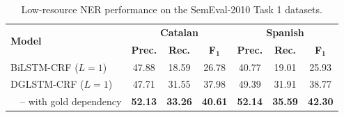\begin{table}[h!]
	\centering
	\begin{tabular}{lcccccc}
		\toprule
		\multirow{2}{*}{\textbf{Model}}&  \multicolumn{3}{c}{\textbf{Catalan}}& \multicolumn{3}{c}{\textbf{Spanish}}\\[-1mm]
		\cmidrule(lr){2-4} \cmidrule(lr){5-7} 
		& \textbf{Prec.} & \textbf{Rec.} & \textbf{F}$_\mathbf{1}$& \textbf{Prec.} & \textbf{Rec.} & \textbf{F}$_\mathbf{1}$ \\
		\midrule
		BiLSTM-CRF ($L=1$) & 47.88 & 18.59 & 26.78 & 40.77 & 19.01 & 25.93 \\
		DGLSTM-CRF ($L=1$) & 47.71 & 31.55 & 37.98&  49.39 & 31.91 & 38.77\\
		~~-- with gold dependency & \textbf{52.13} & \textbf{33.26} & \textbf{40.61} & \textbf{52.14} & \textbf{35.59} & \textbf{42.30} \\
		\bottomrule
	\end{tabular}
	\caption{Low-resource NER performance on the SemEval-2010 Task 1 datasets.}
	\label{tab:lowresources}
\end{table}



